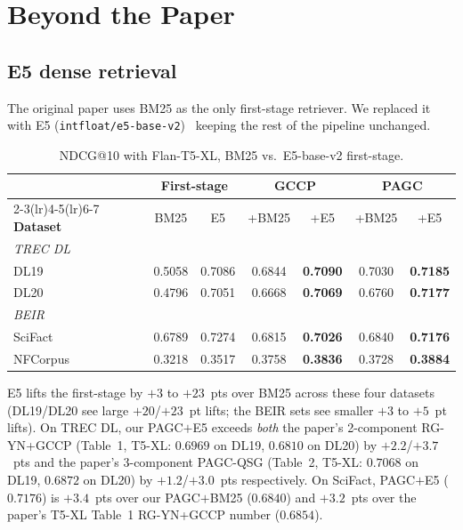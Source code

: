 \documentclass[sigconf]{acmart}
\begin{document}
\section{Beyond the Paper}
\label{sec:beyond}

\subsection{E5 dense retrieval}
\label{sec:e5}
The original paper uses BM25 as the only first-stage retriever. We
replaced it with E5 (\texttt{intfloat/e5-base-v2})~\cite{wang2022e5}
keeping the rest of the pipeline unchanged.

\begin{table}[t]
\centering
\small
\begin{tabular}{lcccccc}
\toprule
 & \multicolumn{2}{c}{\textbf{First-stage}}
 & \multicolumn{2}{c}{\textbf{GCCP}}
 & \multicolumn{2}{c}{\textbf{PAGC}} \\
\cmidrule(lr){2-3}\cmidrule(lr){4-5}\cmidrule(lr){6-7}
\textbf{Dataset} & BM25 & E5 & +BM25 & +E5 & +BM25 & +E5 \\
\midrule
\multicolumn{7}{l}{\emph{TREC DL}} \\
DL19         & 0.5058 & 0.7086 & 0.6844 & \textbf{0.7090} & 0.7030 & \textbf{0.7185} \\
DL20         & 0.4796 & 0.7051 & 0.6668 & \textbf{0.7069} & 0.6760 & \textbf{0.7177} \\
\multicolumn{7}{l}{\emph{BEIR}} \\
SciFact      & 0.6789 & 0.7274 & 0.6815 & \textbf{0.7026} & 0.6840 & \textbf{0.7176} \\
NFCorpus     & 0.3218 & 0.3517 & 0.3758 & \textbf{0.3836} & 0.3728 & \textbf{0.3884} \\
\bottomrule
\end{tabular}
\caption{NDCG@10 with Flan-T5-XL, BM25 vs.\ E5-base-v2 first-stage.}
\label{tab:e5-dl}
\end{table}

E5 lifts the first-stage by $+3$ to $+23$~pts over BM25 across these
four datasets (DL19/DL20 see large $+20$/$+23$~pt lifts; the BEIR
sets see smaller $+3$ to $+5$~pt lifts). On TREC DL, our PAGC$+$E5
exceeds \emph{both} the paper's 2-component RG-YN+GCCP (Table~1,
T5-XL: $0.6969$ on DL19, $0.6810$ on DL20) by $+2.2$/$+3.7$~pts and
the paper's 3-component PAGC-QSG (Table~2, T5-XL: $0.7068$ on DL19,
$0.6872$ on DL20) by $+1.2$/$+3.0$~pts respectively. On SciFact,
PAGC$+$E5 ($0.7176$) is $+3.4$~pts over our PAGC$+$BM25 ($0.6840$)
and $+3.2$~pts over the paper's T5-XL Table~1 RG-YN+GCCP number
($0.6854$).
\end{document}
